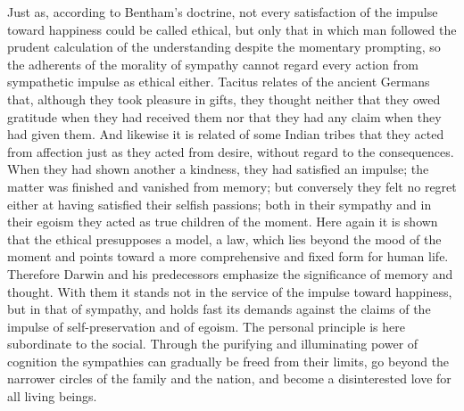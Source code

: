 \documentclass[12pt,a4paper,openany]{book}
\newcommand{\opage}[1]{\marginnote{\footnotesize\textit{[#1]}}}
\begin{document}
Just as, according to Bentham's doctrine, not every satisfaction of the
impulse toward happiness could be called ethical, but only that in which man
followed the prudent calculation of the understanding despite the momentary
prompting, so the adherents of the morality of sympathy cannot regard every
action from sympathetic impulse as ethical either. Tacitus relates of the
ancient Germans that, although they took pleasure in gifts, they thought
neither that they owed gratitude when they had received them nor that they had
any claim when they had given them. And likewise it is related of some Indian
tribes that they acted from affection just as they acted from desire, without
regard to the consequences. When they had shown another a kindness, they had
satisfied an impulse; the matter was finished and vanished from memory; but
conversely they felt no regret either at having satisfied their selfish
passions; both in their sympathy and in their egoism they acted as true
children of the moment. Here again it is shown that the ethical presupposes a
model, a law, which lies beyond the mood of the moment and points toward a
more comprehensive and fixed form \opage{36}for human life. Therefore Darwin
and his predecessors emphasize the significance of memory and thought. With
them it stands not in the service of the impulse toward happiness, but in that
of sympathy, and holds fast its demands against the claims of the impulse of
self-preservation and of egoism. The personal principle is here subordinate to
the social. Through the purifying and illuminating power of cognition the
sympathies can gradually be freed from their limits, go beyond the narrower
circles of the family and the nation, and become a disinterested love for all
living beings.
\end{document}
